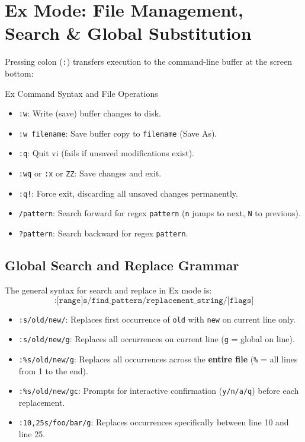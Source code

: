 \section{Ex Mode: File Management, Search \& Global Substitution}
Pressing colon (\texttt{:}) transfers execution to the command-line buffer at the screen bottom:
\begin{commandbox}{Ex Command Syntax and File Operations}
\begin{itemize}[leftmargin=1.5em]
    \item \texttt{:w}: Write (save) buffer changes to disk.
    \item \texttt{:w filename}: Save buffer copy to \texttt{filename} (Save As).
    \item \texttt{:q}: Quit vi (fails if unsaved modifications exist).
    \item \texttt{:wq} or \texttt{:x} or \texttt{ZZ}: Save changes and exit.
    \item \texttt{:q!}: Force exit, discarding all unsaved changes permanently.
    \item \texttt{/pattern}: Search forward for regex \texttt{pattern} (\texttt{n} jumps to next, \texttt{N} to previous).
    \item \texttt{?pattern}: Search backward for regex \texttt{pattern}.
\end{itemize}
\end{commandbox}

\subsection{Global Search and Replace Grammar}
The general syntax for search and replace in Ex mode is:
\begin{equation}
\texttt{:[range]s/find\_pattern/replacement\_string/[flags]}
\end{equation}
\begin{itemize}[leftmargin=1.5em]
    \item \texttt{:s/old/new/}: Replaces first occurrence of \texttt{old} with \texttt{new} on current line only.
    \item \texttt{:s/old/new/g}: Replaces all occurrences on current line (\texttt{g} = global on line).
    \item \texttt{:\%s/old/new/g}: Replaces all occurrences across the \textbf{entire file} (\texttt{\%} = all lines from 1 to the end).
    \item \texttt{:\%s/old/new/gc}: Prompts for interactive confirmation (\texttt{y/n/a/q}) before each replacement.
    \item \texttt{:10,25s/foo/bar/g}: Replaces occurrences specifically between line 10 and line 25.
\end{itemize}

